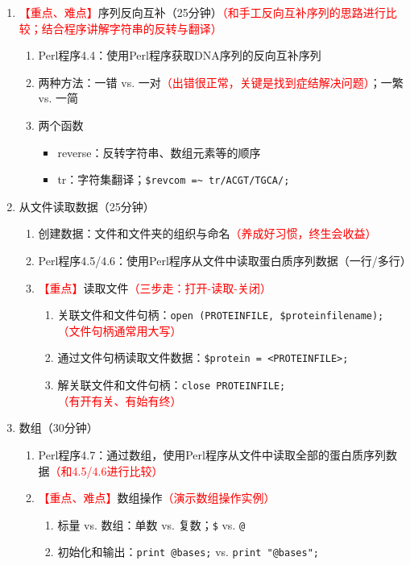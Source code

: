 \documentclass{TIJMUjiaoanLL}
\begin{document}
\begin{enumerate}
  \item \textcolor{red}{【重点、难点】}序列反向互补（25分钟）\textcolor{red}{（和手工反向互补序列的思路进行比较；结合程序讲解字符串的反转与翻译）}
    \begin{enumerate}
      \item Perl程序4.4：使用Perl程序获取DNA序列的反向互补序列
      \item 两种方法：一错 vs. 一对\textcolor{red}{（出错很正常，关键是找到症结解决问题）}；一繁 vs. 一简
      \item 两个函数
	\begin{itemize}
	  \item reverse：反转字符串、数组元素等的顺序
	  \item tr：字符集翻译；\verb|$revcom =~ tr/ACGT/TGCA/;|
	\end{itemize}
    \end{enumerate}
  \item 从文件读取数据（25分钟）
    \begin{enumerate}
      \item 创建数据：文件和文件夹的组织与命名\textcolor{red}{（养成好习惯，终生会收益）}
      \item Perl程序4.5/4.6：使用Perl程序从文件中读取蛋白质序列数据（一行/多行）
      \item \textcolor{red}{【重点】}读取文件\textcolor{red}{（三步走：打开-读取-关闭）}
	\begin{enumerate}
	  \item 关联文件和文件句柄：\verb|open (PROTEINFILE, $proteinfilename);|\textcolor{red}{（文件句柄通常用大写）}
	  \item 通过文件句柄读取文件数据：\verb|$protein = <PROTEINFILE>;|
	  \item 解关联文件和文件句柄：\verb|close PROTEINFILE;|\textcolor{red}{（有开有关、有始有终）}
	\end{enumerate}
    \end{enumerate}
  \item 数组（30分钟）
    \begin{enumerate}
      \item Perl程序4.7：通过数组，使用Perl程序从文件中读取全部的蛋白质序列数据\textcolor{red}{（和4.5/4.6进行比较）}
      \item \textcolor{red}{【重点、难点】}数组操作\textcolor{red}{（演示数组操作实例）}
	\begin{enumerate}
	  \item 标量 vs. 数组：单数 vs. 复数；\verb|$| vs. \verb|@|
	  \item 初始化和输出：\verb|print @bases;| vs. \verb|print "@bases";|

\end{enumerate}
\end{enumerate}
\end{enumerate}
\end{document}
